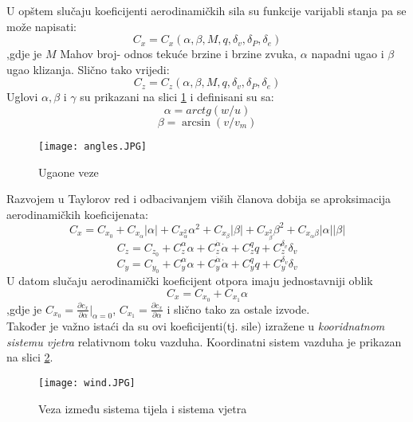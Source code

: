 U opštem slučaju koeficijenti aerodinamičkih sila su funkcije varijabli stanja pa se može
napisati:
\begin{equation}
    C_x=C_x(\alpha ,\beta, M,q,\delta_v,\delta_P,\delta_e)
\end{equation}
,gdje je $M$ Mahov broj- odnos tekuće brzine i brzine zvuka, $\alpha$ napadni ugao i 
$\beta$ ugao klizanja. Slično tako vrijedi:
\begin{equation}
    C_z=C_z(\alpha ,\beta, M,q,\delta_v,\delta_P,\delta_e)
\end{equation}
Uglovi $\alpha, \beta$ i $\gamma$ su prikazani na slici \ref{fig:angles} i definisani su sa:
\begin{equation}
    \alpha=arctg(w/u)
\end{equation}
\begin{equation}
    \beta=\arcsin(v/v_m)
\end{equation}
\begin{figure}[ht!]
    \centering
    \texttt{[image: angles.JPG]}
    \caption{Ugaone veze}
    \label{fig:angles}
\end{figure}
Razvojem u Taylorov red i odbacivanjem viših članova dobija se aproksimacija 
aerodinamičkih koeficijenata:
\begin{equation}
    C_x=C_{x_0}+C_{x_\alpha}|\alpha|+C_{x_\alpha^2}\alpha^2+C_{x_\beta}|\beta|+
    C_{x_\beta^2}\beta^2+C_{x_\alpha \beta}|\alpha||\beta|
\end{equation}
\begin{equation}
   C_z=C_{z_0}+C_z^{\alpha}{\alpha} + C_z^{\dot{\alpha}} \dot{\alpha}+C_z^q q+C_z^{\delta _v}{\delta _v}
\end{equation}
\begin{equation}
    C_y=C_{y_0}+C_y^{\alpha}{\alpha} + C_y^{\dot{\alpha}} \dot{\alpha}+C_y^q q+C_y^{\delta _v}{\delta _v}
\end{equation}
U datom slučaju aerodinamički koeficijent otpora imaju jednostavniji oblik
\begin{equation}
    C_x=C_{x_0} + C_{x_1}\alpha
\end{equation}
,gdje je $C_{x_0}=\frac{\partial c_x}{\partial \alpha}|_{\alpha=0}$, $C_{x_1}=\frac{\partial c_x}{\partial \alpha}$ 
i slično tako za ostale izvode.\\
Također je važno istaći da su ovi koeficijenti(tj. sile) izražene u \textit{kooridnatnom sistemu vjetra} 
relativnom toku vazduha. Koordinatni sistem vazduha je prikazan na slici \ref{fig:wind}. 
\begin{figure}[ht!]
    \centering
    \texttt{[image: wind.JPG]}
    \caption{Veza između sistema tijela i sistema vjetra}
    \label{fig:wind}
\end{figure}

